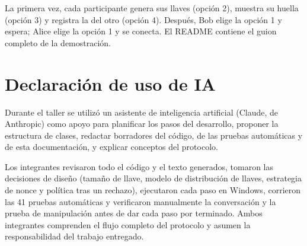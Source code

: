 \documentclass[11pt,a4paper]{article}
\theoremstyle{definition}
\theoremstyle{remark}
\begin{document}
La primera vez, cada participante genera sus llaves (opción 2), muestra su
huella (opción 3) y registra la del otro (opción 4). Después, Bob elige la
opción 1 y espera; Alice elige la opción 1 y se conecta. El README contiene
el guion completo de la demostración.

\section{Declaración de uso de IA}
\label{anx:ia}

Durante el taller se utilizó un asistente de inteligencia artificial
(Claude, de Anthropic) como apoyo para planificar los pasos del desarrollo,
proponer la estructura de clases, redactar borradores del código, de las
pruebas automáticas y de esta documentación, y explicar conceptos del
protocolo.

Los integrantes revisaron todo el código y el texto generados, tomaron las
decisiones de diseño (tamaño de llave, modelo de distribución de llaves,
estrategia de nonce y política tras un rechazo), ejecutaron cada paso en
Windows, corrieron las 41 pruebas automáticas y verificaron manualmente la
conversación y la prueba de manipulación antes de dar cada paso por
terminado. Ambos integrantes comprenden el flujo completo del protocolo y
asumen la responsabilidad del trabajo entregado.
\end{document}

